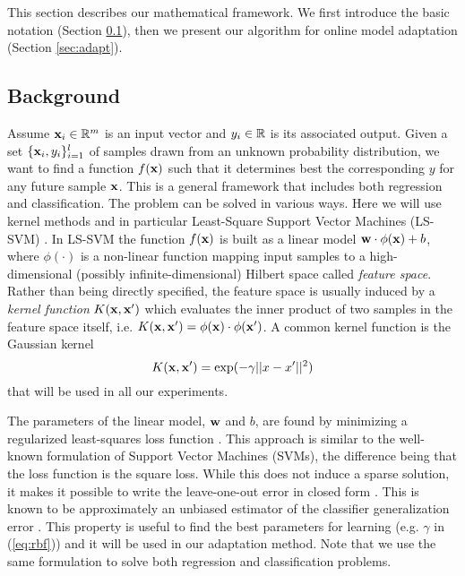 This section describes our mathematical framework. We first introduce
the basic notation (Section \ref{sec:back}), then we present our algorithm
for online model adaptation (Section \ref{sec:adapt}).

\subsection{Background}
\label{sec:back}

Assume $\mathbf{x}_i \in \mathbb{R}^m$ is an input vector and $y_i \in \mathbb{R}$ is its
associated output.  Given a set $\{\mathbf{x}_i,y_i\}_{i=1}^l$ of samples
drawn from an unknown probability distribution, we want to find a
function $f(\mathbf{x})$ such that it determines best
the corresponding 
$y$ for any future sample $\mathbf{x}$.
This is a general framework that includes both regression and
classification.  The problem can be solved in various
ways. Here we will use kernel methods and in particular Least-Square
Support Vector Machines (LS-SVM) \cite{Cristianini00}. In LS-SVM the
function $f(\mathbf{x})$ is built as a linear model $\mathbf{w} \cdot \phi(\mathbf{x}) +
b$, where $\phi(\cdot)$ is a non-linear function mapping input samples
to a high-dimensional (possibly infinite-dimensional) Hilbert space
called \emph{feature space}. Rather than being directly specified, the
feature space is usually induced by a \emph{kernel function}
$K(\mathbf{x},\mathbf{x}')$ which evaluates the inner product of two samples in the
feature space itself,
i.e. $K(\mathbf{x},\mathbf{x}')=\phi(\mathbf{x}) \cdot \phi(\mathbf{x}')$. A common kernel
function is the Gaussian kernel
\begin{equation}
  K(\mathbf{x},\mathbf{x}')=\exp(-\gamma ||x-x'||^2)
  \label{eq:rbf}
\end{equation}
\noindent that will be used in all our experiments.

The parameters of the linear model, $\mathbf{w}$ and $b$, are found by
minimizing a regularized least-squares loss function
\cite{Cristianini00}. This approach is similar to the well-known
formulation of Support Vector Machines (SVMs), the difference being
that the loss function is the square loss.
While this does not induce a sparse solution,
it makes it possible to write the leave-one-out error in closed form
\cite{Rifkin07}. This is known to be approximately an unbiased
estimator of the classifier generalization error \cite{LuntzB69}. This
property is useful to find the best parameters for learning
(e.g. $\gamma$ in (\ref{eq:rbf})) and it will be used in our
adaptation method. Note that we use the same formulation to solve both
regression and classification problems.

